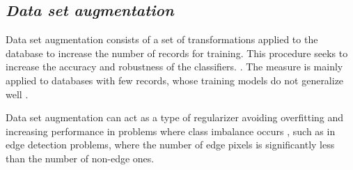\subsection{\textit{Data set augmentation}}
\label{cap2_data_augmentation}

Data set augmentation consists of a set of transformations applied to the database to increase the number of records for training.
This procedure seeks to increase the accuracy and robustness of the classifiers. \cite{ADAPT_DT_AUGM:2016:7533048}. 
The measure is mainly applied to databases with few records, whose training models do not generalize well \cite{Perez:2017:EFF_DT_AUGM}.

Data set augmentation can act as a type of regularizer avoiding overfitting and increasing performance in problems where class imbalance occurs \cite{Wong:2016:UNDERST_DT_AUGM}, such as in edge detection problems, where the number of edge pixels is significantly less than the number of non-edge ones.

